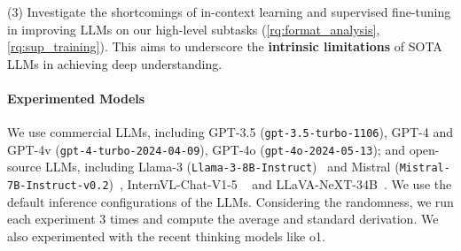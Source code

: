 (3) Investigate the shortcomings of in-context learning and supervised fine-tuning in improving LLMs on our high-level subtasks (\ref{rq:format_analysis}, \ref{rq:sup_training}). This aims to underscore the \textbf{intrinsic limitations} of SOTA LLMs in achieving deep understanding.

\paragraph{Experimented Models}
We use commercial LLMs, including GPT-3.5 ({\small \texttt{gpt-3.5-turbo-1106}}), GPT-4 and GPT-4v ({\small \texttt{gpt-4-turbo-2024-04-09}}), GPT-4o ({\small \texttt{gpt-4o-2024-05-13}});
and open-source LLMs, including Llama-3 ({\small \texttt{Llama-3-8B-Instruct}})~\cite{llama3} and Mistral ({\small \texttt{Mistral-7B-Instruct-v0.2}})~\cite{jiang2023mistral}, InternVL-Chat-V1-5 
~\cite{chen2023internvl,chen2024far}%
and LLaVA-NeXT-34B~\cite{liu2023improvedllava,liu2023llava}.
We use the default
inference configurations of the LLMs.
Considering the randomness, we run each experiment 3 times and compute the average and standard derivation.
We also experimented with the recent thinking models like o1.











